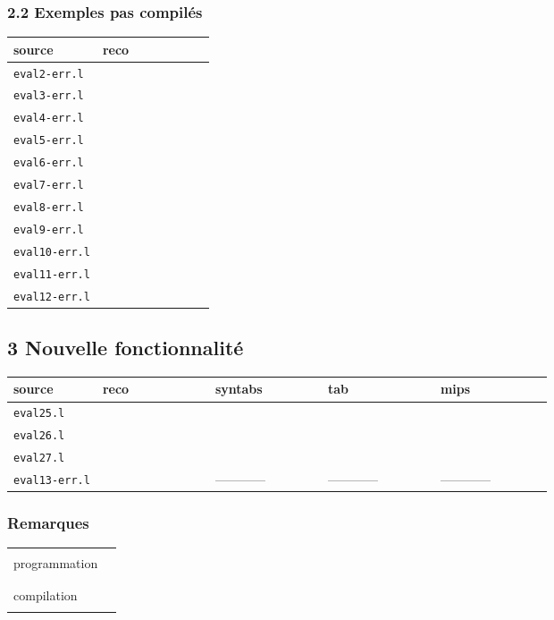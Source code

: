 \documentclass[12pt,a4paper]{article}
\begin{document}

\subsubsection*{2.2 Exemples pas compilés}

\begin{longtable}{|p{2.5cm}|l|} \hline
source       & reco \\ \hline
{\tt eval2-err.l} &~~~~~~~~~~~~~~~~  \\ \hline
{\tt eval3-err.l} &      \\ \hline
{\tt eval4-err.l} &      \\ \hline
{\tt eval5-err.l} &      \\ \hline
{\tt eval6-err.l} &      \\ \hline
{\tt eval7-err.l} &      \\ \hline
{\tt eval8-err.l} &      \\ \hline
{\tt eval9-err.l} &      \\ \hline
{\tt eval10-err.l} &      \\ \hline
{\tt eval11-err.l} &      \\ \hline
{\tt eval12-err.l} &      \\ \hline

\end{longtable}

\subsection*{3 Nouvelle fonctionnalité}

\begin{longtable}{|p{2.5cm}|l|l|l|l|} \hline
source       & reco & syntabs & tab & mips \\ \hline
{\tt eval25.l} &~~~~~~~~~~~~~~~~      &~~~~~~~~~~~~~~~~ &~~~~~~~~~~~~~~~~ &~~~~~~~~~~~~~~~~        \\ \hline
{\tt eval26.l} &      &      &      &         \\ \hline
{\tt eval27.l} &      &      &      &         \\ \hline
{\tt eval13-err.l} &      &   ------------    &   ------------    &  ------------ \\ \hline
\end{longtable}

\subsubsection*{Remarques}

\begin{longtable}{|p{3cm}|p{11cm}|} \hline
& \\
programmation & \\ 
& \\\hline
& \\
compilation & \\
& \\\hline
\end{longtable}
\end{document}
